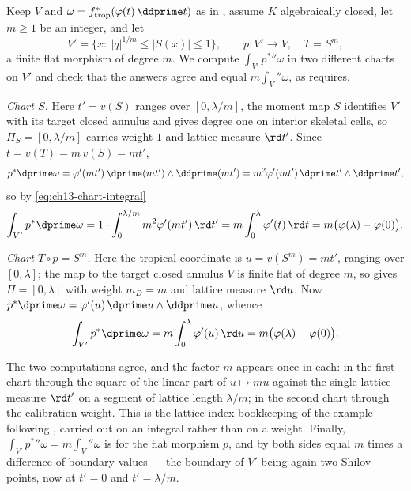 \begin{example}
\label{ex:ch13-stokes-annulus-weight}
Keep $V$ and $\omega=f_{\mathrm{trop}}^*(\varphi(t)\,\ddprime t)$ as in
, assume $K$ algebraically closed, let $m\ge1$
be an integer, and let
\[
 V'=\{x:\ |q|^{1/m}\le|S(x)|\le1\},
 \qquad
 p:V'\longrightarrow V,\quad T=S^m,
\]
a finite flat morphism of degree $m$.  We compute
$\int_{V'}p^*\dprime\omega$ in two different charts on $V'$ and check that
the answers agree and equal $m\int_V\dprime\omega$, as
 requires.

\emph{Chart $S$.}  Here $t'=v(S)$ ranges over $[0,\lambda/m]$, the moment map
$S$ identifies $V'$ with its target closed annulus and gives degree one
on interior skeletal cells, so $\Pi_S=[0,\lambda/m]$ carries weight $1$
and lattice
measure $\rd t'$.  Since $t=v(T)=m\,v(S)=mt'$,
\[
 p^*\dprime\omega
 =\varphi'(mt')\,\dprime(mt')\wedge\ddprime(mt')
 =m^2\varphi'(mt')\,\dprime t'\wedge\ddprime t',
\]
so by \eqref{eq:ch13-chart-integral}
\[
 \int_{V'}p^*\dprime\omega
 =1\cdot\int_0^{\lambda/m}m^2\varphi'(mt')\,\rd t'
 =m\int_0^\lambda\varphi'(t)\,\rd t
 =m\bigl(\varphi(\lambda)-\varphi(0)\bigr).
\]

\emph{Chart $T\circ p=S^m$.}  Here the tropical coordinate is
$u=v(S^m)=mt'$, ranging over $[0,\lambda]$; the map to the target
closed annulus $V$ is finite flat of degree $m$, so
 gives $\Pi=[0,\lambda]$ with weight
$m_D=m$ and lattice measure $\rd u$.  Now
$p^*\dprime\omega=\varphi'(u)\,\dprime u\wedge\ddprime u$, whence
\[
 \int_{V'}p^*\dprime\omega
 =m\int_0^\lambda\varphi'(u)\,\rd u
 =m\bigl(\varphi(\lambda)-\varphi(0)\bigr).
\]

The two computations agree, and the factor $m$ appears once in each: in the
first chart through the square of the linear part of $u\mapsto mu$ against
the single lattice measure $\rd t'$ on a segment of lattice length
$\lambda/m$; in the second chart through the calibration weight.  This is the
lattice-index bookkeeping of the example following
, carried out on an integral rather than
on a weight.  Finally,
$\int_{V'}p^*\dprime\omega=m\int_V\dprime\omega$ is
 for the flat morphism $p$, and by
 both sides equal $m$ times a difference of boundary
values --- the boundary of $V'$ being again two Shilov points, now at
$t'=0$ and $t'=\lambda/m$.
\end{example}

